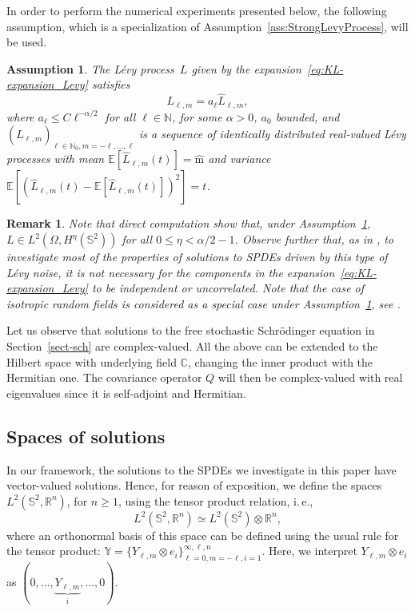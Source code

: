 \documentclass[11pt]{amsart}
\newtheorem{remark}[theorem]{Remark}
\newtheorem{assumption}{Assumption}
\newcommand{\R}{{\mathbb R}}
\newcommand{\N}{{\mathbb N}}
\newcommand{\E}{{\mathbb E}}
\newcommand{\IS}{\mathbb{S}}
\newcommand{\mean}{\mathrm{m}}
\begin{document}
In order to perform the numerical experiments presented below, the following assumption, which is a specialization of Assumption~\ref{ass:StrongLevyProcess}, will be used.
\begin{assumption}\label{ass:SpecialLevyProcess}
	The L\'evy process~$L$ given by the expansion~\eqref{eq:KL-expansion_Levy} satisfies
	\begin{equation*}
		L_{\ell,m} = a_{\ell} \hat{L}_{\ell,m},
	\end{equation*}
	where $a_\ell \leq C \ell^{-\alpha/2}$ for all $\ell\in \N$, for some $\alpha > 0$, $a_0$ bounded, and $(\hat{L}_{\ell,m})_{\ell\in\N_0, m=-\ell,\ldots,\ell}$ is a sequence of identically distributed real-valued Lévy processes with mean $\E\left[\hat{L}_{\ell,m}(t)\right] = \hat{\mean}$ and variance $\E\left[\left(\hat{L}_{\ell,m}(t) - \E\left[\hat{L}_{\ell,m}(t)\right]\right)^2\right] = t$.
\end{assumption}

\begin{remark}
Note that direct computation show that, under Assumption~\ref{ass:SpecialLevyProcess}, $L \in L^2(\Omega, H^\eta({\IS^{2}}))$ for all $0 \leq \eta < \alpha/2 - 1$.
Observe further that, as in \cite{papi2025}, to investigate most of the properties of solutions to SPDEs driven by this type of Lévy noise, it is not necessary
for the components in the expansion~\eqref{eq:KL-expansion_Levy} to be independent or uncorrelated.
Note that the case of isotropic random fields is considered as a special case under Assumption~\ref{ass:SpecialLevyProcess}, see \cite{MR4462619,MR4701212,MR3404631}.
\end{remark}

Let us observe that solutions to the free stochastic Schr\"odinger equation in Section~\ref{sect-sch} are complex-valued. All the above can be extended to the Hilbert space with underlying field $\mathbb{C}$, changing the inner product with the Hermitian one. The covariance operator $Q$ will then be complex-valued with real eigenvalues since it is self-adjoint and Hermitian.

\subsection{Spaces of solutions}\label{solution_spaces}
In our framework, the solutions to the SPDEs we investigate in this paper have vector-valued solutions.
Hence, for reason of exposition, we define the spaces $L^2(\IS^2,\R^n)$, for $n\geq1$, using the tensor product relation, i.\,e.,
$$
L^2(\IS^2,\R^n)\simeq L^2(\IS^2)\otimes \R^n,
$$
where an orthonormal basis of this space can be defined using the usual rule for the tensor product: $\mathbb{Y}=\{Y_{\ell,m}\otimes e_i\}_{\ell=0,m=-\ell,i=1}^{\infty,\ell,n}$.
Here, we interpret
$Y_{\ell,m}\otimes e_i$ as $(0,\dots,\underbrace{Y_{\ell,m}}_i,\dots,0)$.
\end{document}
